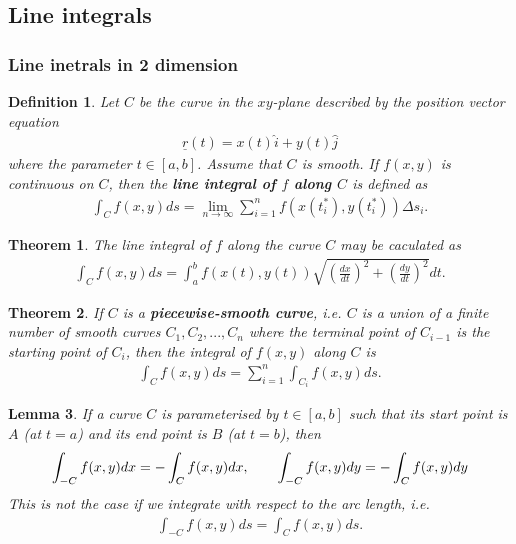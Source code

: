 \documentclass{article}
\theoremstyle{sltheorem}
\newtheorem{definition}{Definition}[section]
\newtheorem{theorem}{Theorem}[section]
\newtheorem{lemma}[theorem]{Lemma}
\newcommand{\ih}{\widehat i}
\newcommand{\jh}{\widehat j}
\newcommand{\hs}{\hspace{0.7cm}}
\renewcommand{\vec}{\underline}
\newcommand*\B[1]{\textbf{#1}}
\begin{document}
\subsection{Line integrals}
\subsubsection{Line inetrals in 2 dimension}
\begin{definition}
    Let $C$ be the curve in the $xy$-plane described by the position vector equation
    \begin{align*}
        \vec r(t) = x(t)\ih + y(t)\jh
    \end{align*}
    where the parameter $t\in[a,b]$. Assume that $C$ is smooth. 
    If $f(x,y)$ is continuous on $C$, then the \B{line integral of $f$ along $C$} is
    defined as
    \begin{align*}
        \int_C f(x,y) ds = \lim_{n\to\infty} \sum_{i=1}^n f(x(t_i^*), y(t_i^*))\Delta s_i.
    \end{align*}
\end{definition}
\begin{theorem}
    The line integral of $f$ along the curve $C$ may be caculated as
    \begin{align*}
        \int_C f(x,y)ds = \int_a^b f(x(t), y(t))\sqrt{\left(\frac{dx}{dt}\right)^2 + 
        \left(\frac{dy}{dt}\right)^2}dt.
    \end{align*}
\end{theorem}
\begin{theorem}
    If $C$ is a \B{piecewise-smooth curve}, i.e. $C$ is a union of a finite number of smooth
    curves $C_1, C_2, ..., C_n$ where the terminal point of $C_{i-1}$ is the starting point
    of $C_i$, then the integral of $f(x,y)$ along $C$ is
    \begin{align*}
        \int_C f(x,y)ds = \sum_{i=1}^n \int_{C_i} f(x,y)ds.
    \end{align*}
\end{theorem}
\begin{lemma}
    If a curve $C$ is parameterised by $t\in[a,b]$ such that its start point is $A$
    (at $t=a$) and its end point is $B$ (at $t=b$), then
    \begin{align*}
        \int_{-C} f(x,y)dx = -\int_C f(x,y)dx,\hs 
        \int_{-C}f(x,y)dy = -\int_C f(x,y)dy
    \end{align*}
    This is not the case if we integrate with respect to the arc length, i.e.
    \begin{align*}
        \int_{-C}f(x,y)ds = \int_C f(x,y)ds.
    \end{align*}
\end{lemma}
\end{document}
